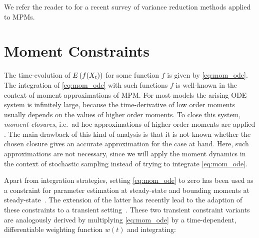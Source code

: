 
We refer the reader to \textcite{beentjes2021a} for a recent survey of variance reduction methods applied to \acp{MPM}.



\section{Moment Constraints}\label{sec:cv:moments}
The time-evolution of ${E}\left(f(X_t)\right)$ for some function $f$ is given by \eqref{eq:mom_ode}.
The integration of \eqref{eq:mom_ode} with such functions $f$ is well-known in the context of
moment approximations of \ac{MPM}.
For most models the arising \ac{ODE} system is infinitely large, because the time-derivative of
low order moments usually depends on the values of higher order moments.
To close this system, \emph{moment closures}, i.e.\ ad-hoc approximations of higher order moments
are applied \parencite{schnoerr2015}.
The main drawback of this kind of analysis is that it is not known whether the chosen closure gives
an accurate approximation for the case at hand.
Here, such approximations are not necessary, since we will apply the moment dynamics in the context
of stochastic sampling instead of trying to integrate \eqref{eq:mom_ode}.

Apart from integration strategies,
setting \eqref{eq:mom_ode} to zero has been used as a constraint for parameter estimation at steady-state
\parencite{backenkohler2018moment} and bounding moments at steady-state~\parencite{dowdy2018bounds,ghusinga2017exact,kuntz2017rigorous}.
The extension of the latter has recently lead to the adaption of these constraints
to a transient setting~\parencite{dowdy2018dynamic,sakurai2019bounding}.
These two transient constraint variants are analogously derived by multiplying \eqref{eq:mom_ode}
by a time-dependent, differentiable weighting function $w(t)$ and integrating:

